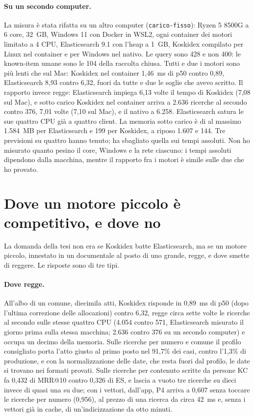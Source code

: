 \paragraph{Su un secondo computer.} La misura è stata rifatta su un altro
computer (\texttt{carico-fisso}): Ryzen 5 8500G a 6 core, 32~GB, Windows 11 con
Docker in WSL2, ogni container dei motori limitato a 4 CPU, Elasticsearch 9.1
con l'heap a 1~GB, Koskidex compilato per Linux nel container e per Windows nel
nativo. Le query sono 428 e non 400: le known-item umane sono le 104 della
raccolta chiusa. Tutti e due i motori sono più lenti che sul Mac: Koskidex nel
container 1,46~ms di p50 contro 0,89, Elasticsearch 8,93 contro 6,32, fuori da
tutte e due le soglie che avevo scritto. Il rapporto invece regge:
Elasticsearch impiega 6,13 volte il tempo di Koskidex (7,08 sul Mac), e sotto
carico Koskidex nel container arriva a 2.636 ricerche al secondo contro 376, 7,01
volte (7,10 sul Mac), e il nativo a 6.258. Elasticsearch satura le sue quattro
CPU già a quattro client. La memoria sotto carico è di al massimo 1.584~MB per
Elasticsearch e 199 per Koskidex, a riposo 1.607 e 144. Tre previsioni su
quattro hanno tenuto; ha sbagliato quella sui tempi assoluti. Non ho misurato
quanto pesino il core, Windows e la rete ciascuno: i tempi assoluti dipendono
dalla macchina, mentre il rapporto fra i motori è simile sulle due che ho provato.

\section{Dove un motore piccolo è competitivo, e dove no}\label{sec:competitivo}

La domanda della tesi non era se Koskidex batte Elasticsearch, ma se un motore
piccolo, innestato in un documentale al posto di uno grande, regge, e dove
smette di reggere. Le risposte sono di tre tipi.

\paragraph{Dove regge.} All'albo di un comune, diecimila atti, Koskidex
risponde in 0,89~ms di p50 (dopo l'ultima correzione delle allocazioni) contro 6,32, regge circa sette volte le ricerche al
secondo sulle stesse quattro CPU (4.054 contro 571, Elasticsearch misurato il
giorno prima sulla stessa macchina; 2.636 contro 376 su un secondo computer) e
occupa un decimo della memoria. Sulle ricerche per
numero e comune il profilo consigliato porta l'atto giusto al primo posto nel
91,7\% dei casi, contro l'1,3\% di produzione, e con la normalizzazione delle
date, che resta fuori dal profilo, le date si trovano nei formati provati.
Sulle ricerche per contenuto scritte da persone KC fa 0,432 di MRR@10 contro
0,326 di ES, e lascia a vuoto tre ricerche su dieci invece di quasi una su due;
con i vettori, dall'app, P4 arriva a 0,607 senza toccare le ricerche per numero
(0,956), al prezzo di una ricerca da circa 42~ms e, senza i vettori già in cache, di
un'indicizzazione da otto minuti.

